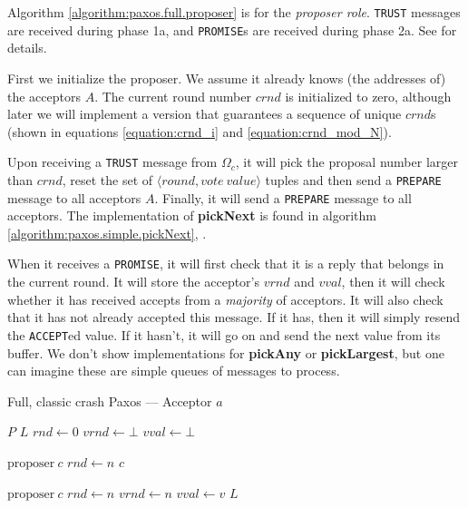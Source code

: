 Algorithm \ref{algorithm:paxos.full.proposer}
 is for the \textit{proposer
role}.  \texttt{TRUST} messages are received during phase 1a, and
\texttt{PROMISE}s are received during phase 2a. See \cite{Lam01} for details.

First we initialize the proposer. We assume it already knows (the addresses
of) the acceptors $A$.  The current round number $crnd$ is initialized to
zero, although later we will implement a version that guarantees a sequence
of unique $crnd$s (shown in equations \ref{equation:crnd_i} and
\ref{equation:crnd_mod_N}).

Upon receiving a \texttt{TRUST} message from $\Omega_c$, it will pick the
proposal number larger than $crnd$, reset the set of
$\langle round, vote~value\rangle$ tuples and then send a
\texttt{PREPARE} message to all acceptors $A$.  Finally, it will
send a \texttt{PREPARE} message to all acceptors.
%
The implementation of \textbf{pickNext} is found in
algorithm \ref{algorithm:paxos.simple.pickNext},
.

When it receives a \texttt{PROMISE}, it will first check that it is a reply
that belongs in the current round.  It will store the acceptor's $vrnd$ and
$vval$, then it will check whether it has received accepts from a
\textit{majority} of acceptors.
It will also check that it has not already accepted this message.
If it has, then it will simply resend the \texttt{ACCEPT}ed value.
If it hasn't, it will go on and send the next value from its buffer.
We don't show implementations for \textbf{pickAny} or \textbf{pickLargest},
but one can imagine these are simple queues of messages to process.

\begin{algorithm}[H]
  \caption{Full, classic crash Paxos --- Acceptor $a$}
  \label{algorithm:paxos.full.acceptor}
  \begin{algorithmic}
    \State $P$ 
    \State $L$ 
    \State $rnd \gets 0$ 
    \State $vrnd \gets \bot$ 
    \State $vval \gets \bot$ 
    \State

       {$\text{proposer}\ c$} 
         \State $rnd \gets n$
         \State {}
                       {$c$}
      \EndIf
    \EndOn
    \State

       {$\text{proposer}\ c$} 
        \State $rnd \gets n$
        \State $vrnd \gets n$
        \State $vval \gets v$
        \State {}
                      {$L$}
      \EndIf
    \EndOn
  \end{algorithmic}
\end{algorithm}

